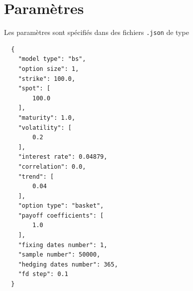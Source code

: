 \documentclass[a4paper,11pt]{article}
\begin{document}
\section{Paramètres}
\label{sec:params}

Les paramètres sont spécifiés dans des fichiers \verb!.json! de type

\begin{verbatim}
  {
    "model type": "bs",
    "option size": 1,
    "strike": 100.0,
    "spot": [
        100.0
    ],
    "maturity": 1.0,
    "volatility": [
        0.2
    ],
    "interest rate": 0.04879,
    "correlation": 0.0,
    "trend": [
        0.04
    ],
    "option type": "basket",
    "payoff coefficients": [
        1.0
    ],
    "fixing dates number": 1,
    "sample number": 50000,
    "hedging dates number": 365,
    "fd step": 0.1
  }
\end{verbatim}
\end{document}
